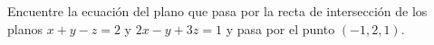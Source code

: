 \item Encuentre la ecuación del plano que pasa por la recta de intersección de los planos $x + y - z = 2$ y $2x - y + 3z = 1$ y pasa por el punto $(-1, 2, 1)$.
